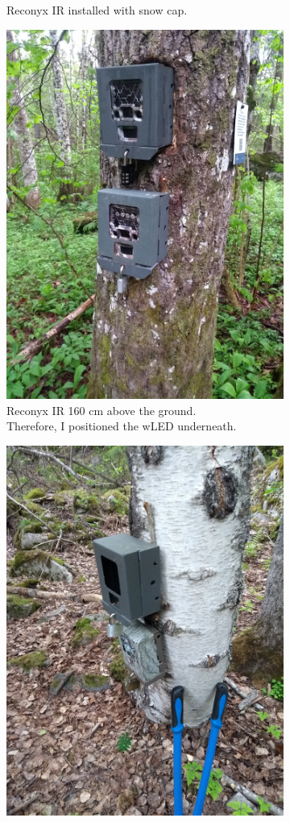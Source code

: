 \begin{figure}
\begin{subfigure}{.5\textwidth}
		  \caption{Reconyx IR installed with snow cap.}
		  	\label{fig:cam_ex_b}
	\end{subfigure}
		\begin{subfigure}{.5\textwidth}
		  \centering
		  	\includegraphics[width=.8\linewidth]{./img/cam_install_example/IMG_20190521_181329313.jpg}
		  \caption{Reconyx IR 160 cm above the ground.\\ Therefore, I positioned the wLED underneath.}
		  	\label{fig:cam_ex_c}
	\end{subfigure}
		\begin{subfigure}{.5\textwidth}
		  \centering
		  	\includegraphics[width=.8\linewidth]{./img/cam_install_example/IMG_20190529_181049340.jpg}

\end{subfigure}
\end{figure}
